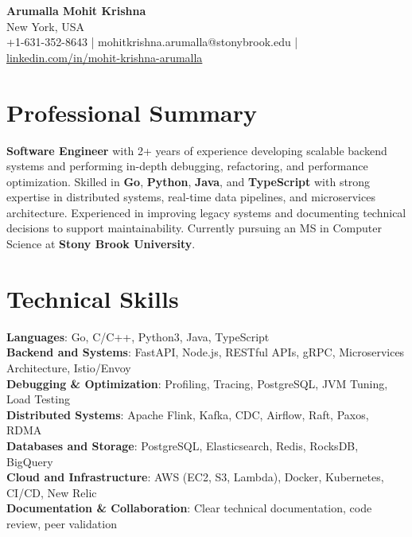 \documentclass[letterpaper,11pt]{article}
\begin{document}
\begin{center}
  {\Large \textbf{Arumalla Mohit Krishna}} \\
  New York, USA \\
  +1-631-352-8643 \enspace | \enspace mohitkrishna.arumalla@stonybrook.edu \enspace | \enspace \href{https://www.linkedin.com/in/mohit-krishna-arumalla}{linkedin.com/in/mohit-krishna-arumalla}
\end{center}

\section{Professional Summary}
  \begin{itemize}[leftmargin=0.15in, label={}]
    \small{\item{
     \textbf{Software Engineer} with 2+ years of experience developing scalable backend systems and performing in-depth debugging, refactoring, and performance optimization. Skilled in \textbf{Go}, \textbf{Python}, \textbf{Java}, and \textbf{TypeScript} with strong expertise in distributed systems, real-time data pipelines, and microservices architecture. Experienced in improving legacy systems and documenting technical decisions to support maintainability. Currently pursuing an MS in Computer Science at \textbf{Stony Brook University}.
    }}
  \end{itemize}
\vspace{-16pt}

\section{Technical Skills}
 \begin{itemize}[leftmargin=0.15in, label={}]
    \small{\item{
     \textbf{Languages}: Go, C/C++, Python3, Java, TypeScript \\
     \textbf{Backend and Systems}: FastAPI, Node.js, RESTful APIs, gRPC, Microservices Architecture, Istio/Envoy \\
     \textbf{Debugging \& Optimization}: Profiling, Tracing, PostgreSQL, JVM Tuning, Load Testing \\
     \textbf{Distributed Systems}: Apache Flink, Kafka, CDC, Airflow, Raft, Paxos, RDMA \\
     \textbf{Databases and Storage}: PostgreSQL, Elasticsearch, Redis, RocksDB, BigQuery \\
     \textbf{Cloud and Infrastructure}: AWS (EC2, S3, Lambda), Docker, Kubernetes, CI/CD, New Relic \\
     \textbf{Documentation \& Collaboration}: Clear technical documentation, code review, peer validation
    }}
 \end{itemize}
\vspace{-16pt}
\end{document}
